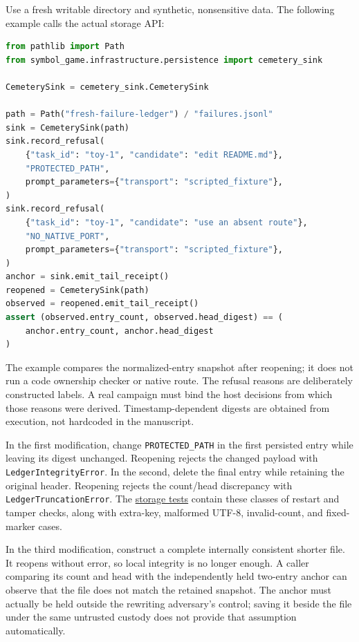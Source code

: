 \documentclass[
  11pt,
]{article}
\newcommand{\passthrough}[1]{#1}
\begin{document}
Use a fresh writable directory and synthetic, nonsensitive data. The
following example calls the actual storage API:

\begin{lstlisting}[language=Python]
from pathlib import Path
from symbol_game.infrastructure.persistence import cemetery_sink

CemeterySink = cemetery_sink.CemeterySink

path = Path("fresh-failure-ledger") / "failures.jsonl"
sink = CemeterySink(path)
sink.record_refusal(
    {"task_id": "toy-1", "candidate": "edit README.md"},
    "PROTECTED_PATH",
    prompt_parameters={"transport": "scripted_fixture"},
)
sink.record_refusal(
    {"task_id": "toy-1", "candidate": "use an absent route"},
    "NO_NATIVE_PORT",
    prompt_parameters={"transport": "scripted_fixture"},
)
anchor = sink.emit_tail_receipt()
reopened = CemeterySink(path)
observed = reopened.emit_tail_receipt()
assert (observed.entry_count, observed.head_digest) == (
    anchor.entry_count, anchor.head_digest
)
\end{lstlisting}

The example compares the normalized-entry snapshot after reopening; it
does not run a code ownership checker or native route. The refusal
reasons are deliberately constructed labels. A real campaign must bind
the host decisions from which those reasons were derived.
Timestamp-dependent digests are obtained from execution, not hardcoded
in the manuscript.

In the first modification, change
\texttt{\nolinkurl{PROTECTED_PATH}} in the first persisted entry
while leaving its digest unchanged. Reopening rejects the changed
payload with \passthrough{\lstinline!LedgerIntegrityError!}. In the
second, delete the final entry while retaining the original header.
Reopening rejects the count/head discrepancy with
\passthrough{\lstinline!LedgerTruncationError!}. The
\href{https://github.com/dbccpage/the_symbol_game/blob/52cb5457f6c485ba548cfd292f6012a941ed22cf/symbol_game/tests/test_cemetery_sink.py}{storage
tests} contain these classes of restart and tamper checks, along with
extra-key, malformed UTF-8, invalid-count, and fixed-marker cases.

In the third modification, construct a complete internally consistent
shorter file. It reopens without error, so local integrity is no longer
enough. A caller comparing its count and head with the independently
held two-entry anchor can observe that the file does not match the
retained snapshot. The anchor must actually be held outside the
rewriting adversary's control; saving it beside the file under the same
untrusted custody does not provide that assumption automatically.
\end{document}
